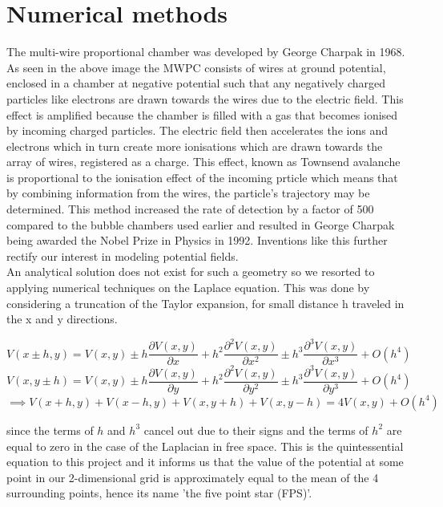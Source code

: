 \documentclass[a4paper]{article}
\begin{document}
\section{Numerical methods}

The multi-wire proportional chamber was developed by George Charpak in 1968. As seen in the above image the MWPC consists of wires at ground potential, enclosed in a chamber at negative potential such that any negatively charged particles like electrons are drawn towards the wires due to the electric field. This effect is amplified because the chamber is filled with a gas that becomes ionised by incoming charged particles. The electric field then accelerates the ions and electrons which in turn create more ionisations which are drawn towards the array of wires, registered as a charge. This effect, known as Townsend avalanche is proportional to the ionisation effect of the incoming prticle which means that by combining information from the wires, the particle's trajectory may be determined. This method increased the rate of detection by a factor of 500 compared to the bubble chambers used earlier and resulted in George Charpak being awarded the Nobel Prize in Physics in 1992. Inventions like this further rectify our interest in modeling potential fields.\\

An analytical solution does not exist for such a geometry so we resorted to applying numerical techniques on the Laplace equation. This was done by considering a truncation of the Taylor expansion, for small distance h traveled in the x and y directions.

\begin{equation}V(x\pm h,y) = V(x,y)\pm h\frac{\partial V(x,y)}{\partial x} + h^2 \frac{\partial^2V(x,y)}{\partial x^2} \pm h^3 \frac{\partial^3V(x,y)}{\partial x^3}+ O(h^4) \end{equation}
\begin{equation} V(x,y\pm h) = V(x,y)\pm h\frac{\partial V(x,y)}{\partial y} + h^2 \frac{\partial^2V(x,y)}{\partial y^2} \pm h^3 \frac{\partial^3V(x,y)}{\partial y^3} + O(h^4) \end{equation}
\begin{equation} \label{FPS} \implies V(x+h,y)+V(x-h,y)+V(x,y+h)+V(x,y-h) = 4V(x,y)+O(h^4)\end{equation}

since the terms of $h$ and $h^3$ cancel out due to their signs and the terms of $h^2$ are equal to zero in the case of the Laplacian in free space. This is the quintessential equation to this project and it informs us that the value of the potential at some point in our 2-dimensional grid is approximately equal to the mean of the 4 surrounding points, hence its name 'the five point star (FPS)'.\\
\end{document}
